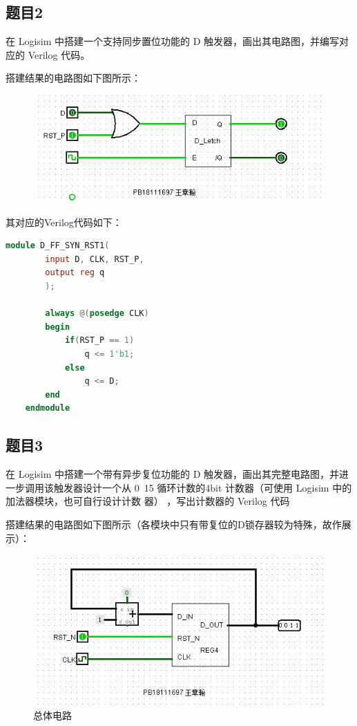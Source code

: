 \documentclass[UTF8]{article}
\begin{document}
	\subsection{题目2}
	在 Logisim 中搭建一个支持同步置位功能的 D 触发器，画出其电路图，并编写对应的 Verilog 代码。\par
	搭建结果的电路图如下图所示：
	\begin{figure}[H]
		\centering
		\includegraphics[width=1\linewidth]{e2_circuit.jpg}
		\label{e2_circuit}
	\end{figure}
	其对应的Verilog代码如下：
	\begin{lstlisting}[language=Verilog]
	module D_FF_SYN_RST1(
		input D, CLK, RST_P,
		output reg q
		);
		
		always @(posedge CLK)
		begin
			if(RST_P == 1)
				q <= 1'b1;
			else
				q <= D;
		end
	endmodule
	\end{lstlisting}
	
	
	\subsection{题目3}
	在 Logisim 中搭建一个带有异步复位功能的 D 触发器，画出其完整电路图，并进一步调用该触发器设计一个从 0~15 循环计数的4bit 计数器（可使用 Logisim 中的加法器模块，也可自行设计计数	器） ，写出计数器的 Verilog 代码\par
	搭建结果的电路图如下图所示（各模块中只有带复位的D锁存器较为特殊，故作展示）：
	\begin{figure}[H]
	\centering
	\includegraphics[width=1\linewidth]{e3_counter.jpg}
	\caption{总体电路}
	\label{e3_counter}
	\end{figure}
	
\end{document}
